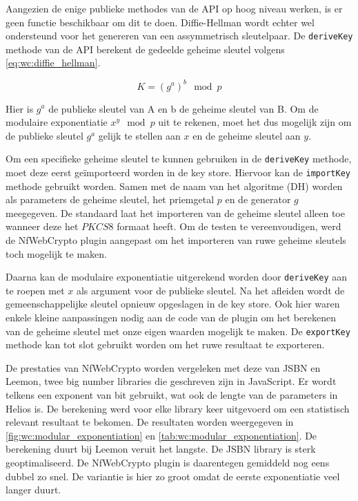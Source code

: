 \npar Aangezien de enige publieke methodes van de API op hoog niveau werken, is er geen functie beschikbaar om dit te doen. Diffie-Hellman wordt echter wel ondersteund voor het genereren van een assymmetrisch sleutelpaar. De \texttt{deriveKey} methode van de API berekent de gedeelde geheime sleutel volgens \ref{eq:wc:diffie_hellman}.\cite{diffie_hellman_new_directions_in_cryptography}

\begin{equation}
  \label{eq:wc:diffie_hellman}
  K = (g^a)^b \mod{p}
\end{equation}

\npar Hier is $g^a$ de publieke sleutel van A en b de geheime sleutel van B.  Om de modulaire exponentiatie $x^y \mod{p}$ uit te rekenen, moet het dus mogelijk zijn om de publieke sleutel $g^a$ gelijk te stellen aan $x$ en de geheime sleutel aan $y$.

\npar Om een specifieke geheime sleutel te kunnen gebruiken in de \texttt{deriveKey} methode, moet deze eerst ge\"importeerd worden in de key store. Hiervoor kan de \texttt{importKey} methode gebruikt worden. Samen met de naam van het algoritme (DH) worden als parameters de geheime sleutel, het priemgetal $p$ en de generator $g$ meegegeven. De standaard laat het importeren van de geheime sleutel alleen toe wanneer deze het $PKCS8$ formaat heeft.\cite{rfc5208} Om de testen te vereenvoudigen, werd de NfWebCrypto plugin aangepast om het importeren van ruwe geheime sleutels toch mogelijk te maken.

\npar Daarna kan de modulaire exponentiatie uitgerekend worden door \texttt{deriveKey} aan te roepen met $x$ als argument voor de publieke sleutel. Na het afleiden wordt de gemeenschappelijke sleutel opnieuw opgeslagen in de key store. Ook hier waren enkele kleine aanpassingen nodig aan de code van de plugin om het berekenen van de geheime sleutel met onze eigen waarden mogelijk te maken. De \texttt{exportKey} methode kan tot slot gebruikt worden om het ruwe resultaat te exporteren. 

\npar De prestaties van NfWebCrypto worden vergeleken met deze van JSBN en Leemon, twee big number libraries die geschreven zijn in JavaScript.\cite{site:wu_rsa_and_ecc_in_javascript}\cite{site:baird_big_integers_in_javascript} Er wordt telkens een exponent van  bit gebruikt, wat ook de lengte van de parameters in Helios is. De berekening werd voor elke library  keer uitgevoerd om een statistisch relevant resultaat te bekomen. De resultaten worden weergegeven in \ref{fig:wc:modular_exponentiation} en \ref{tab:wc:modular_exponentiation}. De berekening duurt bij Leemon veruit het langste. De JSBN library is sterk geoptimaliseerd. De NfWebCrypto plugin is daarentegen gemiddeld nog eens dubbel zo snel. De variantie is hier zo groot omdat de eerste exponentiatie veel langer duurt.

